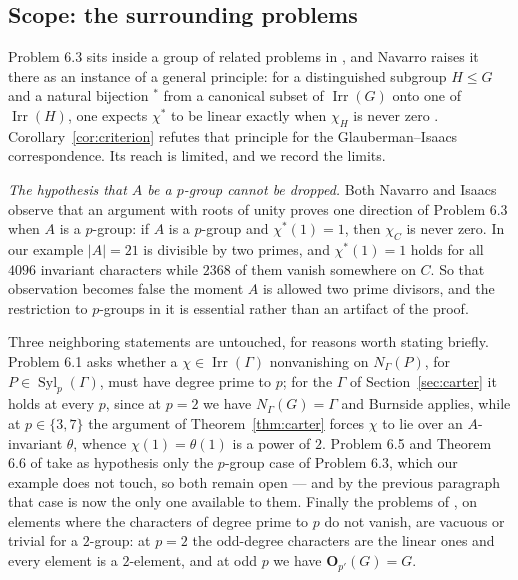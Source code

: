 \documentclass[11pt,a4paper,reqno]{amsart}
\theoremstyle{definition}
\theoremstyle{remark}
\newcommand{\Irr}{\operatorname{Irr}}
\begin{document}
\subsection*{Scope: the surrounding problems}\label{sec:navarro}

Problem 6.3 sits inside a group of related problems in
\cite{navarro-problems}, and Navarro raises it there as an instance of a
general principle: for a distinguished subgroup $H\le G$ and a natural
bijection ${}^*$ from a canonical subset of $\Irr(G)$ onto one of
$\Irr(H)$, one expects $\chi^*$ to be linear exactly when $\chi_H$ is
never zero \cite[p.~189]{navarro-problems}.  Corollary~\ref{cor:criterion}
refutes that principle for the Glauberman--Isaacs correspondence.  Its
reach is limited, and we record the limits.

\emph{The hypothesis that $A$ be a $p$-group cannot be dropped.}
Both Navarro \cite[p.~189]{navarro-problems} and Isaacs
\cite[\S7]{isaacs-carter} observe that an argument with roots of unity
proves one direction of Problem 6.3 when $A$ is a $p$-group: if $A$ is a
$p$-group and $\chi^*(1)=1$, then $\chi_C$ is never zero.  In our
example $|A|=21$ is divisible by two primes, and $\chi^*(1)=1$ holds for
all $4096$ invariant characters while $2368$ of them vanish somewhere on
$C$.  So that observation becomes false the moment $A$ is allowed two
prime divisors, and the restriction to $p$-groups in it is essential
rather than an artifact of the proof.

Three neighboring statements are untouched, for reasons worth stating
briefly.  Problem 6.1 asks whether a $\chi\in\Irr(\Gamma)$ nonvanishing
on $N_\Gamma(P)$, for $P\in\operatorname{Syl}_p(\Gamma)$, must have
degree prime to $p$; for the $\Gamma$ of Section~\ref{sec:carter} it
holds at every $p$, since at $p=2$ we have $N_\Gamma(G)=\Gamma$ and
Burnside applies, while at $p\in\{3,7\}$ the argument of
Theorem~\ref{thm:carter} forces $\chi$ to lie over an $A$-invariant
$\theta$, whence $\chi(1)=\theta(1)$ is a power of $2$.  Problem 6.5
and Theorem 6.6 of \cite{navarro-problems} take as hypothesis only the
$p$-group case of Problem 6.3, which our example does not touch, so
both remain open --- and by the previous paragraph that case is now the
only one available to them.  Finally the problems of
\cite[\S5]{navarro-problems}, on elements where the characters of
degree prime to $p$ do not vanish, are vacuous or trivial for a
$2$-group: at $p=2$ the odd-degree characters are the linear ones and
every element is a $2$-element, and at odd $p$ we have
$\mathbf O_{p'}(G)=G$.
\end{document}
